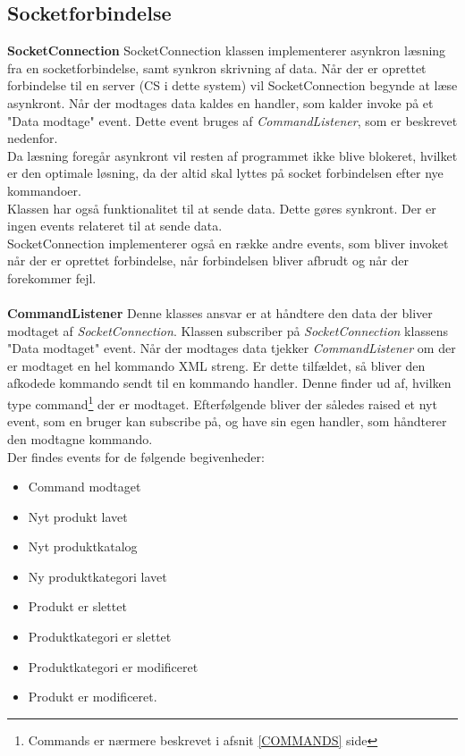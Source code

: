 \subsection{Socketforbindelse} \label{SOCKET}
\textbf{SocketConnection}
SocketConnection klassen implementerer asynkron læsning fra en socketforbindelse, samt synkron skrivning af data. Når der er oprettet forbindelse til en server (\gls{CS} i dette system) vil SocketConnection begynde at læse asynkront. Når der modtages data kaldes en handler, som kalder invoke på et "Data modtage" event. Dette event bruges af \textit{CommandListener}, som er beskrevet nedenfor.\\
Da læsning foregår asynkront vil resten af programmet ikke blive blokeret, hvilket er den optimale løsning, da der altid skal lyttes på socket forbindelsen efter nye kommandoer.\\
Klassen har også funktionalitet til at sende data. Dette gøres synkront. Der er ingen events relateret til at sende data.\\
SocketConnection implementerer også en række andre events, som bliver invoket når der er oprettet forbindelse, når forbindelsen bliver afbrudt og når der forekommer fejl.\\\\
 

\textbf{CommandListener}
Denne klasses ansvar er at håndtere den data der bliver modtaget af \textit{SocketConnection}. Klassen subscriber på \textit{SocketConnection} klassens "Data modtaget" event. Når der modtages data tjekker \textit{CommandListener} om der er modtaget en hel kommando XML streng. Er dette tilfældet, så bliver den afkodede kommando sendt til en kommando handler. Denne finder ud af, hvilken type command\footnote{Commands er nærmere beskrevet i afsnit \ref{COMMANDS} side \pageref{COMMANDS}} der er modtaget. Efterfølgende bliver der således raised et nyt event, som en bruger kan subscribe på, og have sin egen handler, som håndterer den modtagne kommando.\\
Der findes events for de følgende begivenheder:

\begin{itemize}
	\item Command modtaget
	\item Nyt produkt lavet
	\item Nyt produktkatalog
	\item Ny produktkategori lavet
	\item Produkt er slettet
	\item Produktkategori er slettet
	\item Produktkategori er modificeret
	\item Produkt er modificeret.
\end{itemize}

